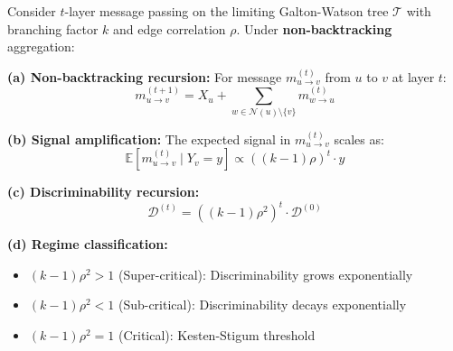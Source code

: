 \begin{theorem}
\label{thm:multilayer_trees}
Consider $t$-layer message passing on the limiting Galton-Watson tree $\mathcal{T}$ with branching factor $k$ and edge correlation $\rho$. Under \textbf{non-backtracking} aggregation:

\textbf{(a) Non-backtracking recursion:}
For message $m_{u \to v}^{(t)}$ from $u$ to $v$ at layer $t$:
\begin{equation}
    m_{u \to v}^{(t+1)} = X_u + \sum_{w \in \mathcal{N}(u) \setminus \{v\}} m_{w \to u}^{(t)}
\end{equation}

\textbf{(b) Signal amplification:}
The expected signal in $m_{u \to v}^{(t)}$ scales as:
\begin{equation}
    \mathbb{E}[m_{u \to v}^{(t)} \mid Y_v = y] \propto ((k-1)\rho)^t \cdot y
\end{equation}

\textbf{(c) Discriminability recursion:}
\begin{equation}
    \mathcal{D}^{(t)} = ((k-1)\rho^2)^t \cdot \mathcal{D}^{(0)}
\end{equation}

\textbf{(d) Regime classification:}
\begin{itemize}
    \item $(k-1)\rho^2 > 1$ (Super-critical): Discriminability grows exponentially
    \item $(k-1)\rho^2 < 1$ (Sub-critical): Discriminability decays exponentially
    \item $(k-1)\rho^2 = 1$ (Critical): Kesten-Stigum threshold~\cite{kesten1966additional,kesten1966limit}
\end{itemize}
\end{theorem}

